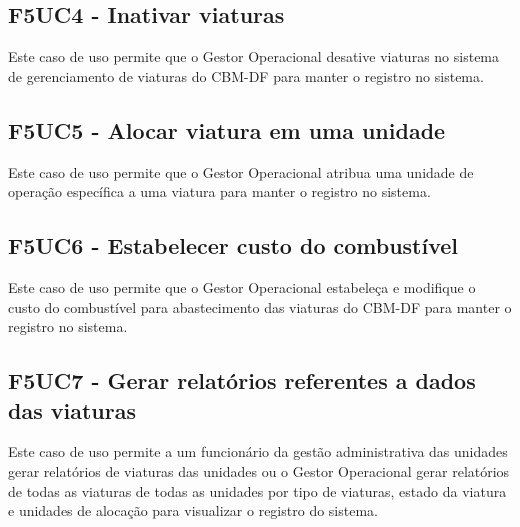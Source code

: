   \subsection{F5UC4 - Inativar viaturas}
Este caso de uso permite que o Gestor Operacional desative viaturas no sistema de gerenciamento de viaturas do CBM-DF para manter o registro no sistema.
  \subsection{F5UC5 - Alocar viatura em uma unidade}
Este caso de uso permite que o Gestor Operacional atribua uma unidade de operação específica a uma viatura para manter o registro no sistema.
  \subsection{F5UC6 - Estabelecer custo do combustível}
Este caso de uso permite que o Gestor Operacional estabeleça e modifique o custo do combustível para abastecimento das viaturas do CBM-DF para manter o registro no sistema.
  \subsection{F5UC7 - Gerar relatórios referentes a dados das viaturas}
Este caso de uso permite a um funcionário da gestão administrativa das unidades gerar relatórios de viaturas das unidades ou o Gestor Operacional gerar relatórios de todas as viaturas de todas as unidades por tipo de viaturas, estado da viatura e unidades de alocação para visualizar o registro do sistema.